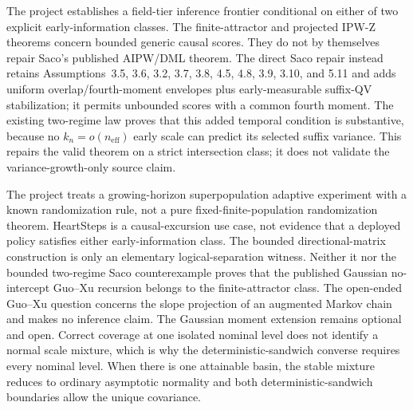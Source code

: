 The project establishes a field-tier inference frontier conditional on either of two explicit early-information classes.  The finite-attractor and projected IPW-Z theorems concern bounded generic causal scores.  They do not by themselves repair Saco's published AIPW/DML theorem.  The direct Saco repair instead retains Assumptions~3.5, 3.6, 3.2, 3.7, 3.8, 4.5, 4.8, 3.9, 3.10, and 5.11 and adds uniform overlap/fourth-moment envelopes plus early-measurable suffix-QV stabilization; it permits unbounded scores with a common fourth moment.  The existing two-regime law proves that this added temporal condition is substantive, because no \(k_n=o(n_{\mathrm{eff}})\) early scale can predict its selected suffix variance.  This repairs the valid theorem on a strict intersection class; it does not validate the variance-growth-only source claim.

The project treats a growing-horizon superpopulation adaptive experiment with a known randomization rule, not a pure fixed-finite-population randomization theorem.  HeartSteps is a causal-excursion use case, not evidence that a deployed policy satisfies either early-information class.  The bounded directional-matrix construction is only an elementary logical-separation witness.  Neither it nor the bounded two-regime Saco counterexample proves that the published Gaussian no-intercept Guo--Xu recursion belongs to the finite-attractor class.  The open-ended Guo--Xu question concerns the slope projection of an augmented Markov chain and makes no inference claim.  The Gaussian moment extension remains optional and open.  Correct coverage at one isolated nominal level does not identify a normal scale mixture, which is why the deterministic-sandwich converse requires every nominal level.  When there is one attainable basin, the stable mixture reduces to ordinary asymptotic normality and both deterministic-sandwich boundaries allow the unique covariance.